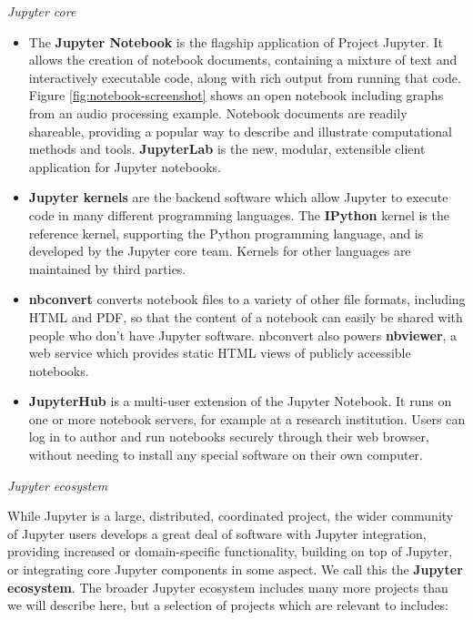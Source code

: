 \medskip\noindent\emph{Jupyter core}
\begin{itemize}
  \item The \textbf{Jupyter Notebook} is the flagship application of Project Jupyter.
  It allows the creation of notebook documents, containing a mixture of text and
  interactively executable code, along with rich output from running that code.
  Figure \ref{fig:notebook-screenshot} shows an open notebook including graphs
  from an audio processing example. Notebook documents are readily shareable,
  providing a popular way to describe and illustrate computational methods and
  tools.
  \textbf{JupyterLab} is the new, modular, extensible client application
  for Jupyter notebooks.

  \item \textbf{Jupyter kernels} are the backend software which allow Jupyter to execute
  code in many different programming languages. The \textbf{IPython} kernel is
  the reference kernel, supporting the Python programming language, and is
  developed by the Jupyter core team. Kernels for other languages are maintained
  by third parties.

  \item \textbf{nbconvert} converts notebook files to a variety of other file
  formats, including HTML and PDF, so that the content of a notebook can easily
  be shared with people who don't have Jupyter software. nbconvert also powers
  \textbf{nbviewer}, a web service which provides static HTML views of publicly
  accessible notebooks.

  \item \textbf{JupyterHub} is a multi-user extension of the Jupyter Notebook.
  It runs on one or more notebook servers, for example at a research institution.
  Users can log in to author and run notebooks securely through their web
  browser, without needing to install any special software on their own
  computer.

\end{itemize}

\medskip\noindent\emph{Jupyter ecosystem}\label{jupyter-ecosystem}

While Jupyter is a large, distributed, coordinated project,
the wider community of Jupyter users develops a great deal of
software with Jupyter integration,
providing increased or domain-specific functionality,
building on top of Jupyter, or integrating core Jupyter components in some aspect.
We call this the \textbf{Jupyter ecosystem}.
The broader Jupyter ecosystem includes many more projects than we will describe
here, but a selection of projects which are relevant to
\TheProject includes:

